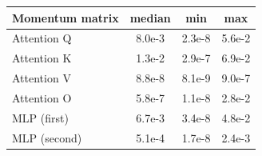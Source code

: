 \begin{tabular}{lccc}
\toprule
Momentum matrix & median & min & max \\
\midrule
Attention $\mathrm{Q}$ & 8.0e-3 & 2.3e-8 & 5.6e-2 \\
Attention $\mathrm{K}$ & 1.3e-2 & 2.9e-7 & 6.9e-2 \\
Attention $\mathrm{V}$ & 8.8e-8 & 8.1e-9 & 9.0e-7 \\
Attention $\mathrm{O}$ & 5.8e-7 & 1.1e-8 & 2.8e-2 \\
MLP (first) & 6.7e-3 & 3.4e-8 & 4.8e-2 \\
MLP (second) & 5.1e-4 & 1.7e-8 & 2.4e-3 \\
\bottomrule
\end{tabular}
